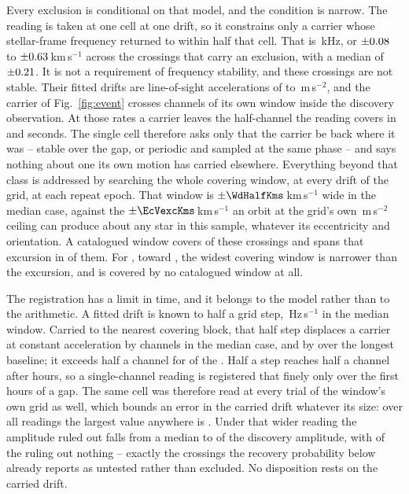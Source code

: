Every exclusion is conditional on that model, and the condition is narrow. The reading is taken at one cell at one drift, so it constrains only a
carrier whose stellar-frame frequency returned to within half that cell. That
is \TjChanKHz\,kHz, or $\pm0.08$ to $\pm0.63$\,km\,s$^{-1}$ across
the \RcNExcl{} crossings that carry an exclusion, with a median of
$\pm0.21$. It is not a requirement of frequency stability, and these crossings are
not stable. Their fitted drifts are line-of-sight accelerations of
\ZtALosLo{} to \ZtALosHi\,m\,s$^{-2}$, and the carrier of
Fig.~\ref{fig:event} crosses \EvADriftChan{} channels of its own window
inside the discovery observation. At those rates a carrier leaves the
half-channel the reading covers in \ZtSxLeaveSec{} and \ZtCpLeaveSec{}
seconds. The single cell therefore asks
only that the carrier be back where it was -- stable over the gap, or
periodic and sampled at the same phase -- and says nothing about one its own
motion has carried elsewhere. Everything beyond that class is addressed by searching the whole covering
window, at every drift of the grid, at each repeat epoch. That window is
$\pm\WdHalfKms$\,km\,s$^{-1}$ wide in the median case, against the
$\pm\EcVexcKms$\,km\,s$^{-1}$ an orbit at the grid's own
\WdAGrid\,m\,s$^{-2}$ ceiling can produce about any star in this sample,
whatever its eccentricity and orientation. A catalogued window covers
\WdNOrbTot{} of these \RcNExcl{} crossings and spans that excursion in
\EcNSpan{} of them. For \EcNShort, toward \EcShortStarList, the widest
covering window is narrower than the excursion, and \WdNNoCov{} is covered by
no catalogued window at all.

The registration has a limit in time, and it belongs to the model rather than
to the arithmetic. A fitted drift is known to half a grid step, \ZtStepMed\,Hz\,s$^{-1}$ in
the median window. Carried to the nearest covering block, that half step
displaces a carrier at constant acceleration by \ZtRegChanMed{} channels in
the median case, and by \ZtRegChanFarMed{} over the longest baseline; it
exceeds half a channel for \ZtNRegNear{} of the \RcNExcl. Half a step
reaches half a channel after \ZtRegHoursMed{} hours, so a single-channel
reading is registered that finely only over the first hours of a gap. The
same cell was therefore read at every trial of the window's own grid as well,
which bounds an error in the carried drift whatever its size: over all
\RcNRepeatMeas{} readings the largest value anywhere is \RcTMax. Under that
wider reading the amplitude ruled out falls from a median \RcFracMed{} to
\ZtFracWideMed{} of the discovery amplitude, with \ZtNWideVac{} of the
\RcNExcl{} ruling out nothing -- exactly the crossings the recovery
probability below already reports as untested rather than excluded. No
disposition rests on the carried drift.

